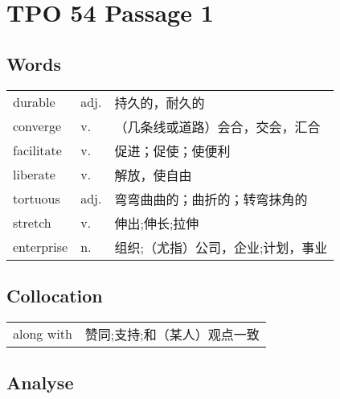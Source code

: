 \section{TPO 54 Passage 1}

\subsection{Words}

\begin{tabular}{lll}
    durable    & adj. & 持久的，耐久的            \\
    converge   & v.   & （几条线或道路）会合，交会，汇合   \\
    facilitate & v.   & 促进；促使；使便利          \\
    liberate   & v.   & 解放，使自由             \\
    tortuous   & adj. & 弯弯曲曲的；曲折的；转弯抹角的    \\
    stretch    & v.   & 伸出;伸长;拉伸           \\
    enterprise & n.   & 组织;（尤指）公司，企业;计划，事业 \\
\end{tabular}

\subsection{Collocation}

\begin{tabular}{ll}
    along with & 赞同;支持;和（某人）观点一致 \\
\end{tabular}

\subsection{Analyse}

